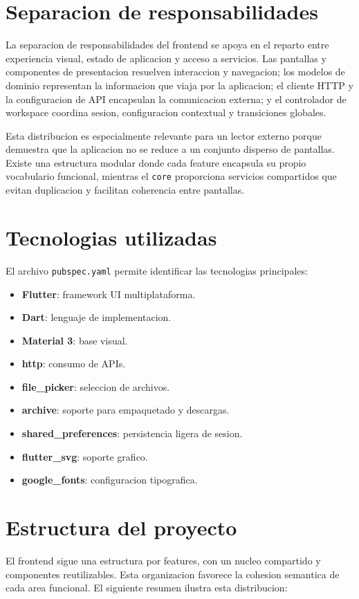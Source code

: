 \documentclass[conference]{IEEEtran}
\begin{document}
\section{Separacion de responsabilidades}
La separacion de responsabilidades del frontend se apoya en el reparto entre experiencia visual, estado de aplicacion y acceso a servicios. Las pantallas y componentes de presentacion resuelven interaccion y navegacion; los modelos de dominio representan la informacion que viaja por la aplicacion; el cliente HTTP y la configuracion de API encapsulan la comunicacion externa; y el controlador de workspace coordina sesion, configuracion contextual y transiciones globales.

Esta distribucion es especialmente relevante para un lector externo porque demuestra que la aplicacion no se reduce a un conjunto disperso de pantallas. Existe una estructura modular donde cada feature encapsula su propio vocabulario funcional, mientras el \texttt{core} proporciona servicios compartidos que evitan duplicacion y facilitan coherencia entre pantallas.

\section{Tecnologias utilizadas}
El archivo \texttt{pubspec.yaml} permite identificar las tecnologias principales:

\begin{itemize}[leftmargin=*]
\item \textbf{Flutter}: framework UI multiplataforma.
\item \textbf{Dart}: lenguaje de implementacion.
\item \textbf{Material 3}: base visual.
\item \textbf{http}: consumo de APIs.
\item \textbf{file\_picker}: seleccion de archivos.
\item \textbf{archive}: soporte para empaquetado y descargas.
\item \textbf{shared\_preferences}: persistencia ligera de sesion.
\item \textbf{flutter\_svg}: soporte grafico.
\item \textbf{google\_fonts}: configuracion tipografica.
\end{itemize}

\section{Estructura del proyecto}
El frontend sigue una estructura por features, con un nucleo compartido y componentes reutilizables. Esta organizacion favorece la cohesion semantica de cada area funcional. El siguiente resumen ilustra esta distribucion:
\end{document}
